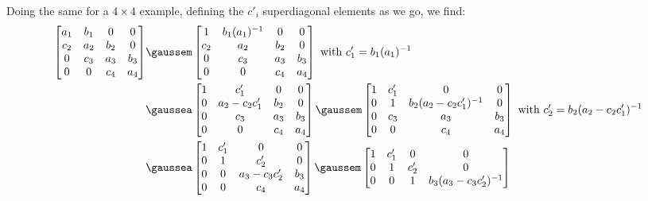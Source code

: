 Doing the same for a $4 \times 4$ example, defining the $c'_i$ superdiagonal elements as we go, we find:
\begin{align*}
    \begin{bmatrix}
        a_1 & b_1 & 0 & 0 \\
        c_2 & a_2 & b_2 & 0 \\
        0 & c_3 & a_3 & b_3 \\
        0 & 0 & c_4 & a_4 \\
    \end{bmatrix} & \gaussem \begin{bmatrix}
        1 & b_1(a_1)^{-1} & 0 & 0 \\
        c_2 & a_2 & b_2 & 0 \\
        0 & c_3 & a_3 & b_3 \\
        0 & 0 & c_4 & a_4 \\
    \end{bmatrix} \text{ with } c'_1 = b_1(a_1)^{-1} \\
    &\gaussea \begin{bmatrix}
        1 & c'_1 & 0 & 0 \\
        0 & a_2 - c_2c'_1 & b_2 & 0 \\
        0 & c_3 & a_3 & b_3 \\
        0 & 0 & c_4 & a_4 \\
    \end{bmatrix} \gaussem \begin{bmatrix}
        1 & c'_1 & 0 & 0 \\
        0 & 1 & b_2(a_2 - c_2c'_1)^{-1} & 0 \\
        0 & c_3 & a_3 & b_3 \\
        0 & 0 & c_4 & a_4 \\
    \end{bmatrix} \text{ with } c'_2 = b_2(a_2 - c_2c'_1)^{-1} \\
    &\gaussea \begin{bmatrix}
        1 & c'_1 & 0 & 0 \\
        0 & 1 & c'_2 & 0 \\
        0 & 0 & a_3 - c_3c'_2 & b_3 \\
        0 & 0 & c_4 & a_4 \\
    \end{bmatrix} \gaussem \begin{bmatrix}
        1 & c'_1 & 0 & 0 \\
        0 & 1 & c'_2 & 0 \\
        0 & 0 & 1 & b_3(a_3 - c_3c'_2)^{-1} \\

\end{bmatrix}
\end{align*}
